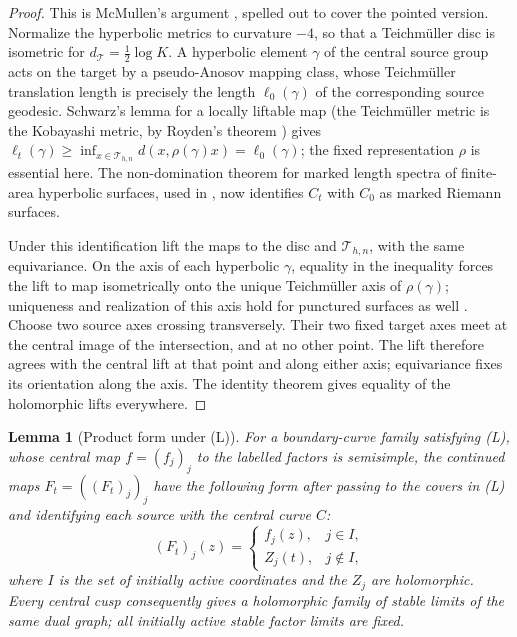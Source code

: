 \documentclass[11pt]{article}
\newcommand{\T}{\mathcal T}
\newtheorem{lemma}[theorem]{Lemma}
\theoremstyle{remark}
\begin{document}
\begin{proof}

This is McMullen's argument \cite{McMullen}, spelled out to
cover the pointed version. Normalize the hyperbolic metrics
to curvature \(-4\), so that a Teichm\"uller disc is isometric
for \(d_{\T}=\frac12\log K\). A hyperbolic element \(\gamma\) of
the central source group acts on the target by a pseudo-Anosov
mapping class, whose Teichm\"uller translation length is precisely
the length \(\ell_0(\gamma)\) of the corresponding source geodesic.
Schwarz's lemma for a locally liftable map (the Teichm\"uller
metric is the Kobayashi metric, by Royden's theorem
\cite[Section 7(A)]{BersFinite}) gives
\(\ell_t(\gamma)\geq\inf_{x\in\T_{h,n}}d(x,\rho(\gamma)x)
=\ell_0(\gamma)\); the fixed representation \(\rho\) is essential
here. The non-domination theorem for marked length spectra of
finite-area hyperbolic surfaces, used in \cite{McMullen}, now
identifies \(C_t\) with \(C_0\) as marked Riemann surfaces.

Under this identification lift the maps to the disc and
\(\T_{h,n}\), with the same equivariance. On the axis of each
hyperbolic \(\gamma\), equality in the inequality forces
the lift to map isometrically onto the unique Teichm\"uller axis
of \(\rho(\gamma)\); uniqueness and realization of this axis hold
for punctured surfaces as well
\cite[Theorem 2.1 and its following remark]{Tanigawa}.
Choose two source axes crossing transversely. Their two fixed
target axes meet at the central image of the intersection, and
at no other point. The lift therefore agrees with the central
lift at that point and along either axis; equivariance fixes its
orientation along the axis. The identity theorem gives equality
of the holomorphic lifts everywhere.
\end{proof}

\begin{lemma}[Product form under (L)]\label{lem:curve}
For a boundary-curve family satisfying (L), whose central map
\(f=(f_j)_j\) to the labelled factors is semisimple, the continued
maps \(F_t=((F_t)_j)_j\) have the following form after passing
to the covers in (L) and identifying each source with the central
curve \(C\):
\begin{equation}\label{eq:product}
 (F_t)_j(z)=
 \begin{cases}
 f_j(z),&j\in I,\\
 Z_j(t),&j\notin I,
 \end{cases}
\end{equation}
where \(I\) is the set of initially active coordinates and the
\(Z_j\) are holomorphic. Every central cusp consequently gives a
holomorphic family of stable limits of the same dual graph; all
initially active stable factor limits are fixed.
\end{lemma}
\end{document}
